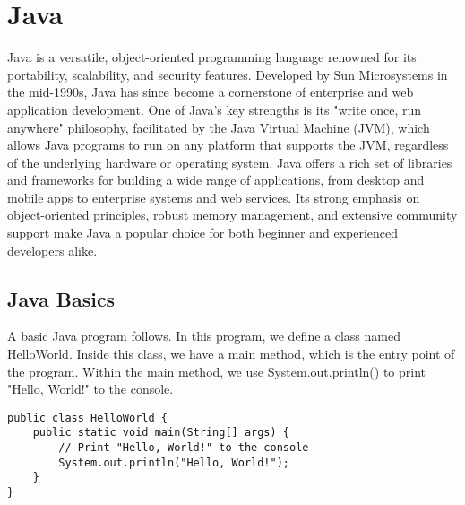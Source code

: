 \chapter{Java}
\thispagestyle{fancy}

Java is a versatile, object-oriented programming language renowned for its portability, scalability, and security features. Developed by Sun Microsystems in the mid-1990s, Java has since become a cornerstone of enterprise and web application development. One of Java's key strengths is its "write once, run anywhere" philosophy, facilitated by the Java Virtual Machine (JVM), which allows Java programs to run on any platform that supports the JVM, regardless of the underlying hardware or operating system. Java offers a rich set of libraries and frameworks for building a wide range of applications, from desktop and mobile apps to enterprise systems and web services. Its strong emphasis on object-oriented principles, robust memory management, and extensive community support make Java a popular choice for both beginner and experienced developers alike.









\section{Java Basics}

A basic Java  program follows. In this program, we define a class named HelloWorld. Inside this class, we have a main method, which is the entry point of the program. Within the main method, we use System.out.println() to print "Hello, World!" to the console.

\begin{lstlisting}
public class HelloWorld {
    public static void main(String[] args) {
        // Print "Hello, World!" to the console
        System.out.println("Hello, World!");
    }
}
\end{lstlisting}